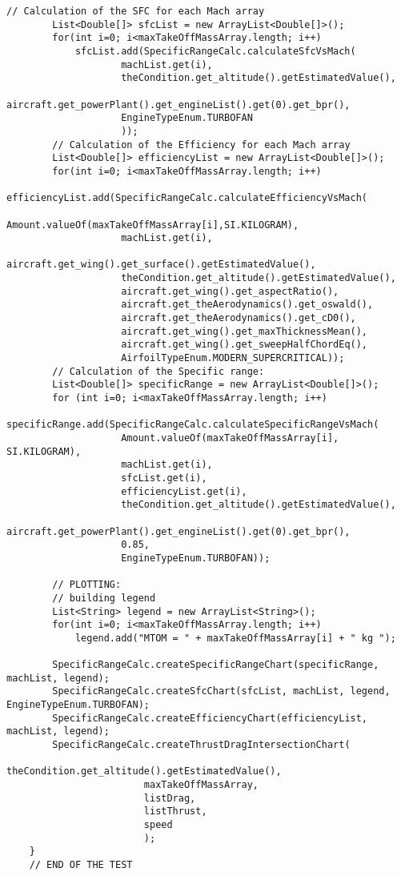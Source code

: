 \bigskip
\begin{lstlisting}[caption={Intersection of drag and thrust curves in Specific Range test - B747-100B}, captionpos=b, tabsize=2]
		// Calculation of the SFC for each Mach array
		List<Double[]> sfcList = new ArrayList<Double[]>();
		for(int i=0; i<maxTakeOffMassArray.length; i++)
			sfcList.add(SpecificRangeCalc.calculateSfcVsMach(
					machList.get(i),
					theCondition.get_altitude().getEstimatedValue(),
					aircraft.get_powerPlant().get_engineList().get(0).get_bpr(),
					EngineTypeEnum.TURBOFAN
					));
		// Calculation of the Efficiency for each Mach array
		List<Double[]> efficiencyList = new ArrayList<Double[]>();
		for(int i=0; i<maxTakeOffMassArray.length; i++)
			efficiencyList.add(SpecificRangeCalc.calculateEfficiencyVsMach(
					Amount.valueOf(maxTakeOffMassArray[i],SI.KILOGRAM),
					machList.get(i),
					aircraft.get_wing().get_surface().getEstimatedValue(),
					theCondition.get_altitude().getEstimatedValue(),
					aircraft.get_wing().get_aspectRatio(),
					aircraft.get_theAerodynamics().get_oswald(),
					aircraft.get_theAerodynamics().get_cD0(),
					aircraft.get_wing().get_maxThicknessMean(),
					aircraft.get_wing().get_sweepHalfChordEq(),
					AirfoilTypeEnum.MODERN_SUPERCRITICAL));
		// Calculation of the Specific range:
		List<Double[]> specificRange = new ArrayList<Double[]>();
		for (int i=0; i<maxTakeOffMassArray.length; i++)
			specificRange.add(SpecificRangeCalc.calculateSpecificRangeVsMach(
					Amount.valueOf(maxTakeOffMassArray[i], SI.KILOGRAM),
					machList.get(i),
					sfcList.get(i),
					efficiencyList.get(i),
					theCondition.get_altitude().getEstimatedValue(),
					aircraft.get_powerPlant().get_engineList().get(0).get_bpr(),
					0.85,
					EngineTypeEnum.TURBOFAN));
	
		// PLOTTING:			
		// building legend
		List<String> legend = new ArrayList<String>();
		for(int i=0; i<maxTakeOffMassArray.length; i++)
			legend.add("MTOM = " + maxTakeOffMassArray[i] + " kg ");
		
		SpecificRangeCalc.createSpecificRangeChart(specificRange, machList, legend);
		SpecificRangeCalc.createSfcChart(sfcList, machList, legend, EngineTypeEnum.TURBOFAN);
		SpecificRangeCalc.createEfficiencyChart(efficiencyList, machList, legend);
		SpecificRangeCalc.createThrustDragIntersectionChart(
						theCondition.get_altitude().getEstimatedValue(),
						maxTakeOffMassArray,
						listDrag,
						listThrust,
						speed
						);	
	}
	// END OF THE TEST
\end{lstlisting}

